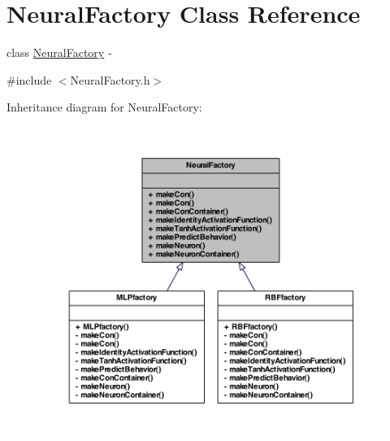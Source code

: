 \hypertarget{class_neural_factory}{
\section{NeuralFactory Class Reference}
\label{class_neural_factory}
}


class \hyperlink{class_neural_factory}{NeuralFactory} -\/  




{\ttfamily \#include $<$NeuralFactory.h$>$}



Inheritance diagram for NeuralFactory:
\nopagebreak
\begin{figure}[H]
\begin{center}
\leavevmode
\includegraphics[width=400pt]{class_neural_factory__inherit__graph}
\end{center}
\end{figure}
